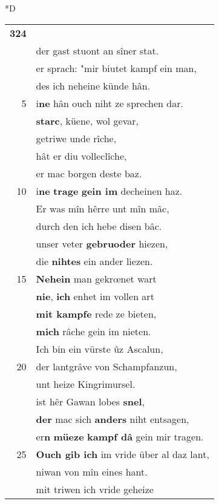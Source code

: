 \documentclass[8pt,a4paper,notitlepage]{article}
\begin{document}
\begin{table}[ht]
\begin{minipage}[t]{0.5\linewidth}
\small
\begin{center}*D
\end{center}
\begin{tabular}{rl}
\textbf{324} & \textit{\begin{large}B\end{large}}eacors al vaste bat.\\ 
 & der gast stuont an sîner stat.\\ 
 & er sprach: "mir biutet kampf ein man,\\ 
 & des ich neheine künde hân.\\ 
5 & i\textbf{ne} hân ouch niht ze sprechen dar.\\ 
 & \textbf{starc}, küene, wol gevar,\\ 
 & getriwe unde rîche,\\ 
 & hât er diu volleclîche,\\ 
 & er mac borgen deste baz.\\ 
10 & i\textbf{ne} \textbf{trage} \textbf{gein im} decheinen haz.\\ 
 & Er was mîn hêrre unt mîn mâc,\\ 
 & durch den ich hebe disen bâc.\\ 
 & unser veter \textbf{gebruoder} hiezen,\\ 
 & die \textbf{nihtes} ein ander liezen.\\ 
15 & \textbf{Nehein} man gekrœnet wart\\ 
 & \textbf{nie}, \textbf{ich} enhet im vollen art\\ 
 & \textbf{mit kampfe} rede ze bieten,\\ 
 & \textbf{mich} râche gein im nieten.\\ 
 & Ich bin ein vürste ûz Ascalun,\\ 
20 & der lantgrâve von Schampfanzun,\\ 
 & unt heize Kingrimursel.\\ 
 & ist hêr Gawan lobes \textbf{snel},\\ 
 & \textbf{der} mac sich \textbf{anders} niht entsagen,\\ 
 & er\textbf{n} \textbf{müeze} \textbf{kampf dâ} gein mir tragen.\\ 
25 & \textbf{Ouch gib ich} im vride über al daz lant,\\ 
 & niwan von mîn eines hant.\\ 
 & mit triwen ich vride geheize\\ 

\end{tabular}
\end{minipage}
\end{table}
\end{document}
